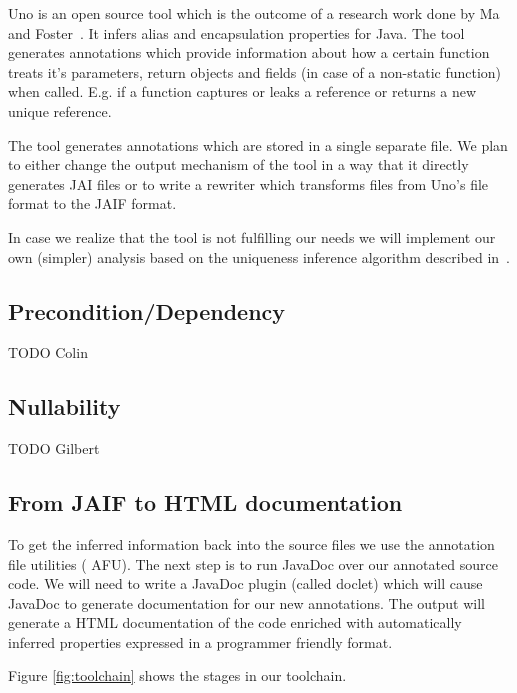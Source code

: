 Uno is an open source tool which is the outcome of a research work done by
Ma and Foster~\cite{Uno}. It infers alias and encapsulation properties for Java.
The tool generates annotations which provide information about how a certain function
treats it's parameters, return objects and fields (in case of a non-static function) 
when called. E.g. if a function captures or leaks a reference or returns a new 
unique reference.

The tool generates annotations which are stored in a single separate file. We plan
to either change the output mechanism of the tool in a way that it directly generates
JAI files or to write a rewriter which transforms files from Uno's file format to the
JAIF format.

In case we realize that the tool is not fulfilling our needs we will implement
our own (simpler) analysis based on the uniqueness inference algorithm
described in~\cite{UniquenessInference}.

\subsection{Precondition/Dependency}

TODO Colin

\subsection{Nullability}
\label{sec:Nullability}
TODO Gilbert


\subsection{From JAIF to HTML documentation}
\label{sec:jaif2html}

To get the inferred information back into the source files we use the annotation 
file utilities (\cite{AFU} AFU). The next step is to run JavaDoc over our
annotated source code. We will need to write a JavaDoc plugin (called doclet) which will
cause JavaDoc to generate documentation for our new annotations. The output will
generate a HTML documentation of the code enriched with automatically inferred
properties expressed in a programmer friendly format.

Figure \ref{fig:toolchain} shows the stages in our toolchain.
